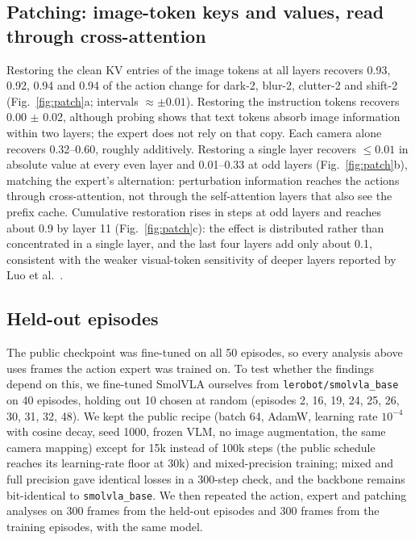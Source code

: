 \documentclass[conference]{IEEEtran}
\begin{document}
\subsection{Patching: image-token keys and values, read through cross-attention}
Restoring the clean KV entries of the image tokens at all layers recovers 0.93, 0.92, 0.94 and 0.94 of the action change for dark-2, blur-2, clutter-2 and shift-2 (Fig.~\ref{fig:patch}a; intervals $\approx \pm 0.01$). Restoring the instruction tokens recovers 0.00 $\pm$ 0.02, although probing shows that text tokens absorb image information within two layers; the expert does not rely on that copy. Each camera alone recovers 0.32--0.60, roughly additively. Restoring a single layer recovers $\le 0.01$ in absolute value at every even layer and 0.01--0.33 at odd layers (Fig.~\ref{fig:patch}b), matching the expert's alternation: perturbation information reaches the actions through cross-attention, not through the self-attention layers that also see the prefix cache. Cumulative restoration rises in steps at odd layers and reaches about 0.9 by layer 11 (Fig.~\ref{fig:patch}c): the effect is distributed rather than concentrated in a single layer, and the last four layers add only about 0.1, consistent with the weaker visual-token sensitivity of deeper layers reported by Luo et al.~\cite{luo2026lookbefore}.


\subsection{Held-out episodes}\label{sec:heldout}
The public checkpoint was fine-tuned on all 50 episodes, so every analysis above uses frames the action expert was trained on. To test whether the findings depend on this, we fine-tuned SmolVLA ourselves from \nolinkurl{lerobot/smolvla_base} on 40 episodes, holding out 10 chosen at random (episodes 2, 16, 19, 24, 25, 26, 30, 31, 32, 48). We kept the public recipe (batch 64, AdamW, learning rate $10^{-4}$ with cosine decay, seed 1000, frozen VLM, no image augmentation, the same camera mapping) except for 15k instead of 100k steps (the public schedule reaches its learning-rate floor at 30k) and mixed-precision training; mixed and full precision gave identical losses in a 300-step check, and the backbone remains bit-identical to \nolinkurl{smolvla_base}. We then repeated the action, expert and patching analyses on 300 frames from the held-out episodes and 300 frames from the training episodes, with the same model.
\end{document}
